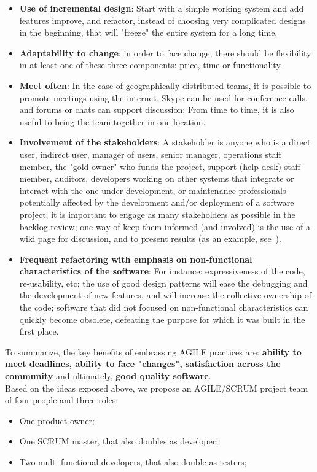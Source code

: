 \documentclass[11pt]{article} %
\begin{document}
\begin{itemize}
\item \textbf{Use of incremental design}: Start with a simple working system and add features improve, and refactor, instead of choosing very complicated designs in the beginning, that will "freeze" the entire system for a long time.
\item \textbf{Adaptability to change}: in order to face change, there should be flexibility in at least one of these three components: price, time or functionality.
\item \textbf{Meet often}: In the case of geographically distributed teams, it is possible to promote meetings using the internet. Skype can be used for conference calls, and forums or chats can support discussion; From time to time, it is also useful to bring the team together in one location.
\item \textbf{Involvement of the stakeholders}: A stakeholder is anyone who is a direct user, indirect user, manager of users, senior manager, operations staff member, the "gold owner" who funds the project, support (help desk) staff member, auditors, developers working on other systems that integrate or interact with the one under development, or maintenance professionals potentially affected by the development and/or deployment of a software project; it is important to engage as many stakeholders as possible in the backlog review; one way of keep them informed (and involved) is the use of a wiki page for discussion, and to present results (as an example, see~\cite{ladybug}).
\item \textbf{Frequent refactoring with emphasis on non-functional characteristics of the software}: For instance: expressiveness of the code, re-usability, etc; the use of good design patterns will ease the debugging and the development of new features, and will increase the collective ownership of the code; software that did not focused on non-functional characteristics can quickly become obsolete, defeating the purpose for which it was built in the first place.
\end{itemize}    
To summarize, the key benefits of embrassing AGILE practices are: \textbf{ability to meet deadlines, ability to face "changes", satisfaction across the community} and ultimately, \textbf{good quality software}.\\
Based on the ideas exposed above, we propose an AGILE/SCRUM project team of four people and three roles:
\begin{itemize}
\item One product owner;
\item One SCRUM master, that also doubles as developer;
\item Two multi-functional developers, that also double as testers;
\end{itemize}
\end{document}
